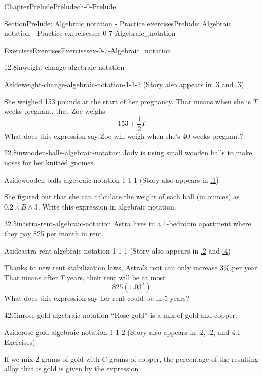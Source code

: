 \documentclass[twoside,11pt,]{book}
\newcommand{\xreffont}{\relax}
\numberwithin{equation}{section}
\begin{document}
\begin{chapterptx}{Chapter}{Prelude}{}{Prelude}{}{}{ch-0-Prelude}
\begin{sectionptx}{Section}{Prelude: Algebraic notation - Practice exercises}{}{Prelude: Algebraic notation - Practice exercises}{}{}{sec-0-7-Algebraic_notation}
\begin{exercises-subsection-numberless}{Exercises}{Exercises}{}{Exercises}{}{}{ex-0-7-Algebraic_notation}
\begin{divisionexercise}{1}{}{2.8in}{weight-change-algebraic-notation}
\begin{aside}{Aside}{}{weight-change-algebraic-notation-1-1-2}
(Story also appears in \hyperlink{weight-change-order-operations}{{\xreffont 0.4.3}} and \hyperlink{weight-change-intercepts}{{\xreffont 4.3.3}})%
\end{aside}
 She weighed 153 pounds at the start of her pregnancy. That means when she is \(T\) weeks pregnant, that Zoe weighs%
\begin{equation*}
153 + \frac{1}{2}T
\end{equation*}
What does this expression say Zoe will weigh when she's 40 weeks pregnant?%
\end{divisionexercise}%
 \begin{divisionexercise}{2}{}{2.8in}{wooden-balls-algebraic-notation}%
Jody is using small wooden balls to make noses for her knitted gnomes. \begin{aside}{Aside}{}{wooden-balls-algebraic-notation-1-1-1}%
(Story also appears in \hyperlink{wooden-balls-powers-roots}{{\xreffont 0.6.1}})%
\end{aside}
 She figured out that she can calculate the weight of each ball (in ounces) as \(0.2 \times B \wedge 3\). Write this expression in algebraic notation.%
\end{divisionexercise}%
\clearpage
\begin{divisionexercise}{3}{}{2.5in}{astra-rent-algebraic-notation}%
Astra lives in a 1-bedroom apartment where they pay \textdollar{}825 per month in rent. \begin{aside}{Aside}{}{astra-rent-algebraic-notation-1-1-1}%
(Story also appears in \hyperlink{astra-rent-percentages}{{\xreffont 0.3.2}} and \hyperlink{astra-rent-logarithms}{{\xreffont 0.9.4}})%
\end{aside}
 Thanks to new rent stabilization laws, Astra's rent can only increase 3\% per year. That means after \(T\) years, their rent will be at most%
\begin{equation*}
825(1.03^T)
\end{equation*}
What does this expression say her rent could be in 5 years?%
\end{divisionexercise}%
 \begin{divisionexercise}{4}{}{2.5in}{rose-gold-algebraic-notation}%
``Rose gold'' is a mix of gold and copper. \begin{aside}{Aside}{}{rose-gold-algebraic-notation-1-1-2}%
(Story also appears in \hyperlink{rose-gold-order-operations}{{\xreffont 0.4.2}}, \hyperlink{rose-gold-using-equations}{{\xreffont 2.3.2}}, and 4.1 Exercises)%
\end{aside}
 If we mix 2 grams of gold with \(C\) grams of copper, the percentage of the resulting alloy that is gold is given by the expression%

\end{divisionexercise}
\end{exercises-subsection-numberless}
\end{sectionptx}
\end{chapterptx}
\end{document}
